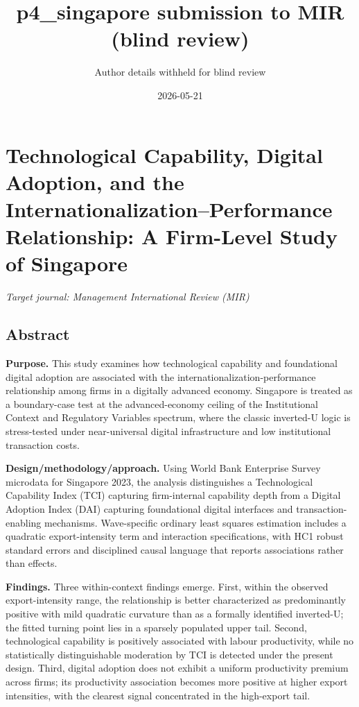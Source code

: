 \documentclass[12pt,a4paper]{article}
\title{p4\_singapore submission to MIR (blind review)}
\author{Author details withheld for blind review}
\date{2026-05-21}
\begin{document}
\maketitle

\hypertarget{technological-capability-digital-adoption-and-the-internationalizationperformance-relationship-a-firm-level-study-of-singapore}{%
\section{Technological Capability, Digital Adoption, and the
Internationalization--Performance Relationship: A Firm-Level Study of
Singapore}\label{technological-capability-digital-adoption-and-the-internationalizationperformance-relationship-a-firm-level-study-of-singapore}}

\emph{Target journal: Management International Review (MIR)}

\hypertarget{abstract}{%
\subsection{Abstract}\label{abstract}}

\textbf{Purpose.} This study examines how technological capability and
foundational digital adoption are associated with the
internationalization-performance relationship among firms in a digitally
advanced economy. Singapore is treated as a boundary-case test at the
advanced-economy ceiling of the Institutional Context and Regulatory
Variables spectrum, where the classic inverted-U logic is stress-tested
under near-universal digital infrastructure and low institutional
transaction costs.

\textbf{Design/methodology/approach.} Using World Bank Enterprise Survey
microdata for Singapore 2023, the analysis distinguishes a Technological
Capability Index (TCI) capturing firm-internal capability depth from a
Digital Adoption Index (DAI) capturing foundational digital interfaces
and transaction-enabling mechanisms. Wave-specific ordinary least
squares estimation includes a quadratic export-intensity term and
interaction specifications, with HC1 robust standard errors and
disciplined causal language that reports associations rather than
effects.

\textbf{Findings.} Three within-context findings emerge. First, within
the observed export-intensity range, the relationship is better
characterized as predominantly positive with mild quadratic curvature
than as a formally identified inverted-U; the fitted turning point lies
in a sparsely populated upper tail. Second, technological capability is
positively associated with labour productivity, while no statistically
distinguishable moderation by TCI is detected under the present design.
Third, digital adoption does not exhibit a uniform productivity premium
across firms; its productivity association becomes more positive at
higher export intensities, with the clearest signal concentrated in the
high-export tail.
\end{document}
